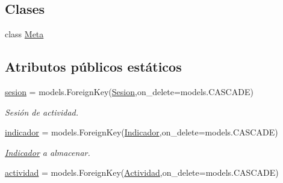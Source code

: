 \subsection*{Clases}
\begin{DoxyCompactItemize}
\item 
class \hyperlink{classappEmotionIOT_1_1models_1_1Resultado__Sesion_1_1Meta}{Meta}
\end{DoxyCompactItemize}
\subsection*{Atributos públicos estáticos}
\begin{DoxyCompactItemize}
\item 
\hyperlink{classappEmotionIOT_1_1models_1_1Resultado__Sesion_a30a30f78ea182a107dee7a0f5a446d68}{sesion} = models.\+Foreign\+Key(\hyperlink{classappEmotionIOT_1_1models_1_1Sesion}{Sesion},on\+\_\+delete=models.\+C\+A\+S\+C\+A\+DE)\hypertarget{classappEmotionIOT_1_1models_1_1Resultado__Sesion_a30a30f78ea182a107dee7a0f5a446d68}{}\label{classappEmotionIOT_1_1models_1_1Resultado__Sesion_a30a30f78ea182a107dee7a0f5a446d68}

\begin{DoxyCompactList}\small\item\em Sesión de actividad. \end{DoxyCompactList}\item 
\hyperlink{classappEmotionIOT_1_1models_1_1Resultado__Sesion_a3986bb0d23cd17ed1bf907337427ad04}{indicador} = models.\+Foreign\+Key(\hyperlink{classappEmotionIOT_1_1models_1_1Indicador}{Indicador},on\+\_\+delete=models.\+C\+A\+S\+C\+A\+DE)\hypertarget{classappEmotionIOT_1_1models_1_1Resultado__Sesion_a3986bb0d23cd17ed1bf907337427ad04}{}\label{classappEmotionIOT_1_1models_1_1Resultado__Sesion_a3986bb0d23cd17ed1bf907337427ad04}

\begin{DoxyCompactList}\small\item\em \hyperlink{classappEmotionIOT_1_1models_1_1Indicador}{Indicador} a almacenar. \end{DoxyCompactList}\item 
\hyperlink{classappEmotionIOT_1_1models_1_1Resultado__Sesion_a534d7c093517470292866ce9ca9d914f}{actividad} = models.\+Foreign\+Key(\hyperlink{classappEmotionIOT_1_1models_1_1Actividad}{Actividad},on\+\_\+delete=models.\+C\+A\+S\+C\+A\+DE)\hypertarget{classappEmotionIOT_1_1models_1_1Resultado__Sesion_a534d7c093517470292866ce9ca9d914f}{}\label{classappEmotionIOT_1_1models_1_1Resultado__Sesion_a534d7c093517470292866ce9ca9d914f}


\end{DoxyCompactItemize}
